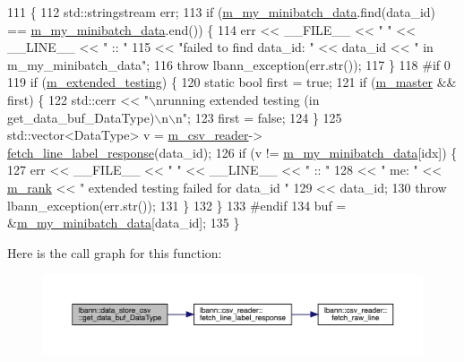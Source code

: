 \begin{DoxyCode}
111                                                                                  \{
112   std::stringstream err;
113   \textcolor{keywordflow}{if} (\hyperlink{classlbann_1_1data__store__csv_a456bbbf6d09c1ec04cd6260cf11007d8}{m\_my\_minibatch\_data}.find(data\_id) == 
      \hyperlink{classlbann_1_1data__store__csv_a456bbbf6d09c1ec04cd6260cf11007d8}{m\_my\_minibatch\_data}.end()) \{
114     err << \_\_FILE\_\_ << \textcolor{stringliteral}{" "} << \_\_LINE\_\_ << \textcolor{stringliteral}{" :: "}
115         << \textcolor{stringliteral}{"failed to find data\_id: "} << data\_id << \textcolor{stringliteral}{" in m\_my\_minibatch\_data"};
116     \textcolor{keywordflow}{throw} lbann\_exception(err.str());
117   \}
118 \textcolor{preprocessor}{  #if 0}
119   \textcolor{keywordflow}{if} (\hyperlink{classlbann_1_1generic__data__store_a5e64702aa4a38c8533fa52944a8473d5}{m\_extended\_testing}) \{
120     \textcolor{keyword}{static} \textcolor{keywordtype}{bool} first = \textcolor{keyword}{true};
121     \textcolor{keywordflow}{if} (\hyperlink{classlbann_1_1generic__data__store_a143fd33ef3a53180bc62745e369c16f8}{m\_master} && first) \{
122       std::cerr << \textcolor{stringliteral}{"\(\backslash\)nrunning extended testing (in get\_data\_buf\_DataType)\(\backslash\)n\(\backslash\)n"};
123       first = \textcolor{keyword}{false};
124     \}
125     std::vector<DataType> v = \hyperlink{classlbann_1_1data__store__csv_a8920e09beb3e40e59e2858daf95a6cf9}{m\_csv\_reader}->
      \hyperlink{classlbann_1_1csv__reader_ae00ba61c2b9db1595ff62ab61a218cfb}{fetch\_line\_label\_response}(data\_id);
126     \textcolor{keywordflow}{if} (v != \hyperlink{classlbann_1_1data__store__csv_a456bbbf6d09c1ec04cd6260cf11007d8}{m\_my\_minibatch\_data}[idx]) \{
127       err << \_\_FILE\_\_ << \textcolor{stringliteral}{" "} << \_\_LINE\_\_ << \textcolor{stringliteral}{" :: "}
128           << \textcolor{stringliteral}{" me: "} << \hyperlink{classlbann_1_1generic__data__store_a87695bfd2d1ed0dbe01d99108e3f68b7}{m\_rank} << \textcolor{stringliteral}{" extended testing failed for data\_id "}
129           << data\_id;
130       \textcolor{keywordflow}{throw} lbann\_exception(err.str());
131     \}
132   \}
133 \textcolor{preprocessor}{  #endif}
134   buf = &\hyperlink{classlbann_1_1data__store__csv_a456bbbf6d09c1ec04cd6260cf11007d8}{m\_my\_minibatch\_data}[data\_id];
135 \}
\end{DoxyCode}
Here is the call graph for this function\+:\nopagebreak
\begin{figure}[H]
\begin{center}
\leavevmode
\includegraphics[width=350pt]{classlbann_1_1data__store__csv_a3125cf637d40e8908c68bb74690f06da_cgraph}
\end{center}
\end{figure}
